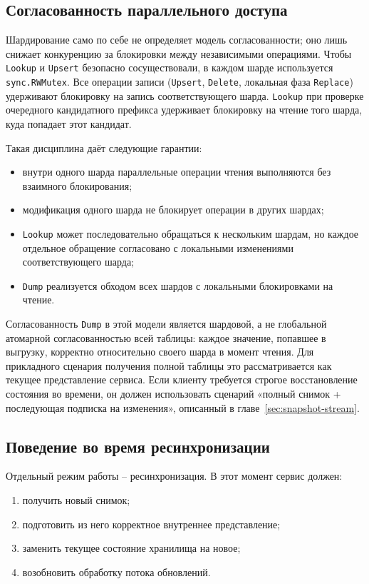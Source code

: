 \subsection{Согласованность параллельного доступа}

Шардирование само по себе не определяет модель согласованности; оно лишь
снижает конкуренцию за блокировки между независимыми операциями. Чтобы
\texttt{Lookup} и \texttt{Upsert} безопасно сосуществовали, в каждом
шарде используется \texttt{sync.RWMutex}. Все операции записи
(\texttt{Upsert}, \texttt{Delete}, локальная фаза \texttt{Replace})
удерживают блокировку на запись соответствующего шарда. \texttt{Lookup}
при проверке очередного кандидатного префикса удерживает блокировку на
чтение того шарда, куда попадает этот кандидат.

Такая дисциплина даёт следующие гарантии:

\begin{itemize}
\item внутри одного шарда параллельные операции чтения выполняются без
взаимного блокирования;
\item модификация одного шарда не блокирует операции в других шардах;
\item \texttt{Lookup} может последовательно обращаться к нескольким
шардам, но каждое отдельное обращение согласовано с локальными
изменениями соответствующего шарда;
\item \texttt{Dump} реализуется обходом всех шардов с локальными
блокировками на чтение.
\end{itemize}

Согласованность \texttt{Dump} в этой модели является шардовой, а не
глобальной атомарной согласованностью всей таблицы: каждое значение,
попавшее в выгрузку, корректно относительно своего шарда в момент чтения.
Для прикладного сценария получения полной таблицы это рассматривается как
текущее представление сервиса. Если клиенту требуется строгое
восстановление состояния во времени, он должен использовать сценарий
«полный снимок + последующая подписка на изменения», описанный в
главе~\ref{sec:snapshot-stream}.

\subsection{Поведение во время ресинхронизации}

Отдельный режим работы -- ресинхронизация. В этот момент сервис должен:

\begin{enumerate}
\item получить новый снимок;
\item подготовить из него корректное внутреннее представление;
\item заменить текущее состояние хранилища на новое;
\item возобновить обработку потока обновлений.
\end{enumerate}

